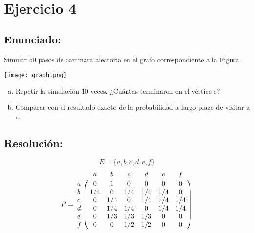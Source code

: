\documentclass{article}
\begin{document}
\section*{Ejercicio 4}
\subsection*{Enunciado:}
Simular 50 pasos de caminata aleatoria en el grafo correspondiente a la Figura.

\texttt{[image: graph.png]}

\begin{enumerate}[(a)] 

\item Repetir la simulación 10 veces. ¿Cuántas terminaron en el vértice c?
\item Comparar con el resultado exacto de la probabilidad a largo plazo de visitar a c. 
\end{enumerate}

\subsection*{Resolución:}

$$ E = \{ a,b,c,d,e,f\} $$
$$
P = 
\bordermatrix{ 
\text{} & a & b & c & d & e & f\cr
a&0&1&0&0&0&0 \cr
b&1/4&0&1/4&1/4&1/4&0 \cr
c&0&1/4&0&1/4&1/4&1/4 \cr
d&0&1/4&1/4&0&1/4&1/4 \cr
e&0&1/3&1/3&1/3&0&0 \cr
f&0&0&1/2&1/2&0&0 
}
$$
\end{document}
